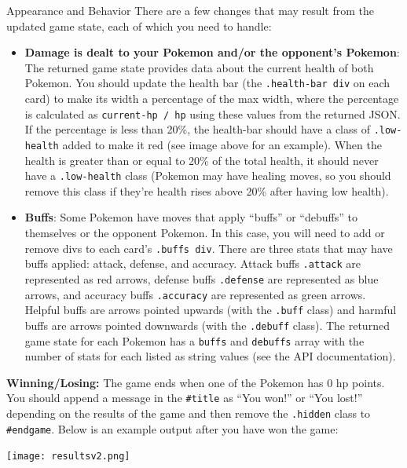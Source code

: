 \documentclass[programming]{../../../../mfcs}
\begin{document}
\begin{question}{Appearance and Behavior}
There are a few changes 
that may result from the updated game
state, each of which you need to handle:

\begin{itemize}
  \item \textbf{Damage is dealt to your Pokemon and/or the opponent's Pokemon}: The returned game
    state provides data about the current health of both Pokemon. You should update the health bar
    (the \texttt{.health-bar div} on each card) to make its width a percentage of the max width, where
    the percentage is calculated as \texttt{current-hp / hp} using these values from the returned
    JSON. If the percentage is less than 20\%, the health-bar should have a class of
    \texttt{.low-health} added to make it red (see image above for an example). When the health is greater than or equal to 20\% of
    the total health, it should never have a \texttt{.low-health} class (Pokemon may have healing
    moves, so you should remove this class if they're health rises above 20\% after having low
    health).
  \item \textbf{Buffs}:
    Some Pokemon have moves that apply ``buffs'' or ``debuffs'' to themselves or the opponent Pokemon.
    In this case, you will need to add or remove divs to each card's \texttt{.buffs div}. There are three
    stats that may have buffs applied: attack, defense, and accuracy. Attack buffs \texttt{.attack} are represented
    as red arrows, defense buffs \texttt{.defense} are represented as blue arrows, and accuracy
    buffs \texttt{.accuracy} are represented
    as green arrows. Helpful buffs are arrows pointed upwards (with the \texttt{.buff} class) and 
    harmful buffs are arrows pointed downwards (with the \texttt{.debuff} class). The returned game
    state for each Pokemon has a \texttt{buffs} and \texttt{debuffs} array with the number of stats
    for each listed as string values (see the API documentation).
\end{itemize}

\textbf{Winning/Losing:} The game ends when one of the Pokemon has 0 hp points. You should append a
message in the \texttt{\#title} as ``You won!'' or ``You lost!'' depending on the results of
the game and then remove the \texttt{.hidden} class to \texttt{\#endgame}. 
Below is an example output after you have won the game:
\begin{center}
  \texttt{[image: resultsv2.png]}
\end{center}
\newline


\end{question}
\end{document}
